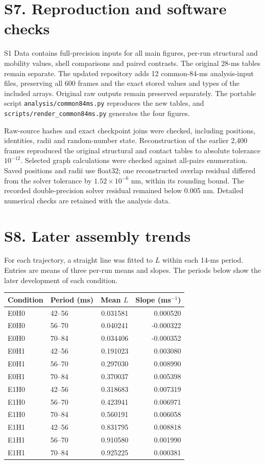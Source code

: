 \documentclass[11pt,letterpaper]{article}
\begin{document}
\section*{S7. Reproduction and software checks}
S1 Data contains full-precision inputs for all main figures, per-run
structural and mobility values, shell comparisons and paired contrasts.
The original 28-ms tables remain separate. The updated repository adds
12 common-84-ms analysis-input files, preserving all 600 frames and the
exact stored values and types of the included arrays. Original raw
outputs remain preserved separately. The portable script
\nolinkurl{analysis/common84ms.py} reproduces the new tables, and
\nolinkurl{scripts/render_common84ms.py} generates the four figures.

Raw-source hashes and exact checkpoint joins were checked, including
positions, identities, radii and random-number state. Reconstruction of
the earlier 2,400 frames reproduced the original structural and contact
tables to absolute tolerance $10^{-12}$. Selected graph calculations
were checked against all-pairs enumeration. Saved positions and radii
use float32; one reconstructed overlap residual differed from the
solver tolerance by $1.52\times10^{-6}$ nm, within its rounding bound.
The recorded double-precision solver residual remained below 0.005 nm.
Detailed numerical checks are retained with the analysis data.

\section*{S8. Later assembly trends}
For each trajectory, a straight line was fitted to $L$ within each
14-ms period. Entries are means of three per-run means and slopes.
The periods below show the later development of each condition.
\begin{center}\small
\begin{tabular}{llrr}
\toprule
Condition & Period (ms) & Mean $L$ & Slope (ms$^{-1}$) \\ \midrule
E0H0 & 42--56 & 0.031581 & 0.000520 \\
E0H0 & 56--70 & 0.040241 & -0.000322 \\
E0H0 & 70--84 & 0.034406 & -0.000352 \\
E0H1 & 42--56 & 0.191023 & 0.003080 \\
E0H1 & 56--70 & 0.297030 & 0.008990 \\
E0H1 & 70--84 & 0.370037 & 0.005398 \\
E1H0 & 42--56 & 0.318683 & 0.007319 \\
E1H0 & 56--70 & 0.423941 & 0.006971 \\
E1H0 & 70--84 & 0.560191 & 0.006058 \\
E1H1 & 42--56 & 0.831795 & 0.008818 \\
E1H1 & 56--70 & 0.910580 & 0.001990 \\
E1H1 & 70--84 & 0.925225 & 0.000381 \\
\bottomrule\end{tabular}\end{center}
\end{document}
